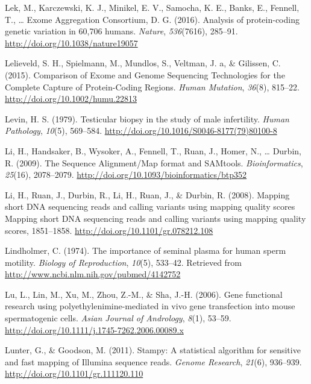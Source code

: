 \documentclass[12pt,twoside]{reedthesis}
\theoremstyle{definition}
\theoremstyle{definition}
\theoremstyle{remark}
\begin{document}
  \hypertarget{ref-Lek2016}{}
  Lek, M., Karczewski, K. J., Minikel, E. V., Samocha, K. E., Banks, E.,
  Fennell, T., \ldots{} Exome Aggregation Consortium, D. G. (2016).
  Analysis of protein-coding genetic variation in 60,706 humans.
  \emph{Nature}, \emph{536}(7616), 285--91.
  \url{http://doi.org/10.1038/nature19057}
  
  \hypertarget{ref-Lelieveld2015}{}
  Lelieveld, S. H., Spielmann, M., Mundlos, S., Veltman, J. a, \&
  Gilissen, C. (2015). Comparison of Exome and Genome Sequencing
  Technologies for the Complete Capture of Protein-Coding Regions.
  \emph{Human Mutation}, \emph{36}(8), 815--22.
  \url{http://doi.org/10.1002/humu.22813}
  
  \hypertarget{ref-Levin1979}{}
  Levin, H. S. (1979). Testicular biopsy in the study of male infertility.
  \emph{Human Pathology}, \emph{10}(5), 569--584.
  \url{http://doi.org/10.1016/S0046-8177(79)80100-8}
  
  \hypertarget{ref-Li2009}{}
  Li, H., Handsaker, B., Wysoker, A., Fennell, T., Ruan, J., Homer, N.,
  \ldots{} Durbin, R. (2009). The Sequence Alignment/Map format and
  SAMtools. \emph{Bioinformatics}, \emph{25}(16), 2078--2079.
  \url{http://doi.org/10.1093/bioinformatics/btp352}
  
  \hypertarget{ref-Li2008}{}
  Li, H., Ruan, J., Durbin, R., Li, H., Ruan, J., \& Durbin, R. (2008).
  Mapping short DNA sequencing reads and calling variants using mapping
  quality scores Mapping short DNA sequencing reads and calling variants
  using mapping quality scores, 1851--1858.
  \url{http://doi.org/10.1101/gr.078212.108}
  
  \hypertarget{ref-Lindholmer1974}{}
  Lindholmer, C. (1974). The importance of seminal plasma for human sperm
  motility. \emph{Biology of Reproduction}, \emph{10}(5), 533--42.
  Retrieved from \url{http://www.ncbi.nlm.nih.gov/pubmed/4142752}
  
  \hypertarget{ref-Lu2006}{}
  Lu, L., Lin, M., Xu, M., Zhou, Z.-M., \& Sha, J.-H. (2006). Gene
  functional research using polyethylenimine-mediated in vivo gene
  transfection into mouse spermatogenic cells. \emph{Asian Journal of
  Andrology}, \emph{8}(1), 53--59.
  \url{http://doi.org/10.1111/j.1745-7262.2006.00089.x}
  
  \hypertarget{ref-Lunter2011}{}
  Lunter, G., \& Goodson, M. (2011). Stampy: A statistical algorithm for
  sensitive and fast mapping of Illumina sequence reads. \emph{Genome
  Research}, \emph{21}(6), 936--939.
  \url{http://doi.org/10.1101/gr.111120.110}
  
\end{document}
